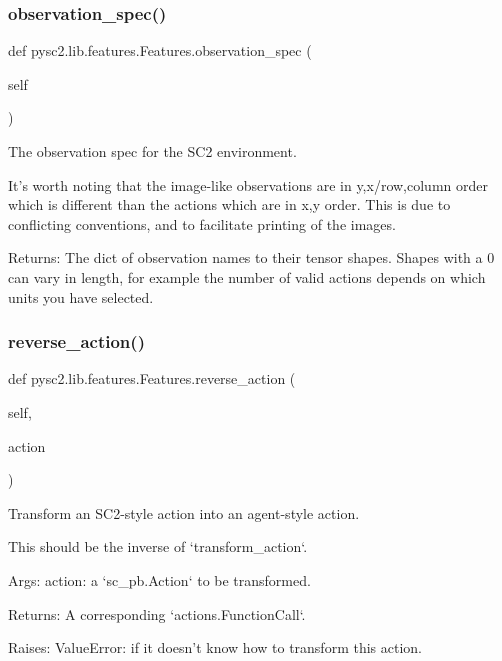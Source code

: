 \subsubsection{\texorpdfstring{observation\+\_\+spec()}{observation\_spec()}}
{\footnotesize\ttfamily def pysc2.\+lib.\+features.\+Features.\+observation\+\_\+spec (\begin{DoxyParamCaption}\item[{}]{self }\end{DoxyParamCaption})}

\begin{DoxyVerb}The observation spec for the SC2 environment.

It's worth noting that the image-like observations are in y,x/row,column
order which is different than the actions which are in x,y order. This is
due to conflicting conventions, and to facilitate printing of the images.

Returns:
  The dict of observation names to their tensor shapes. Shapes with a 0 can
  vary in length, for example the number of valid actions depends on which
  units you have selected.
\end{DoxyVerb}
 \mbox{\label{classpysc2_1_1lib_1_1features_1_1_features_ae50848a35cd3c31833d1eb37662611f3}} 
\subsubsection{\texorpdfstring{reverse\+\_\+action()}{reverse\_action()}}
{\footnotesize\ttfamily def pysc2.\+lib.\+features.\+Features.\+reverse\+\_\+action (\begin{DoxyParamCaption}\item[{}]{self,  }\item[{}]{action }\end{DoxyParamCaption})}

\begin{DoxyVerb}Transform an SC2-style action into an agent-style action.

This should be the inverse of `transform_action`.

Args:
  action: a `sc_pb.Action` to be transformed.

Returns:
  A corresponding `actions.FunctionCall`.

Raises:
  ValueError: if it doesn't know how to transform this action.
\end{DoxyVerb}
 \mbox{\label{classpysc2_1_1lib_1_1features_1_1_features_a4d30783f71487ebbf7ac3cf21873af65}} 
